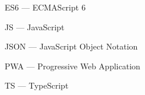 


\hypertarget{es6}{ES6 --- ECMAScript 6}

\hypertarget{js}{JS --- JavaScript}

\hypertarget{json}{JSON --- JavaScript Object Notation}

\hypertarget{pwa}{PWA --- Progressive Web Application}

\hypertarget{ts}{TS --- TypeScript}

\clearpage